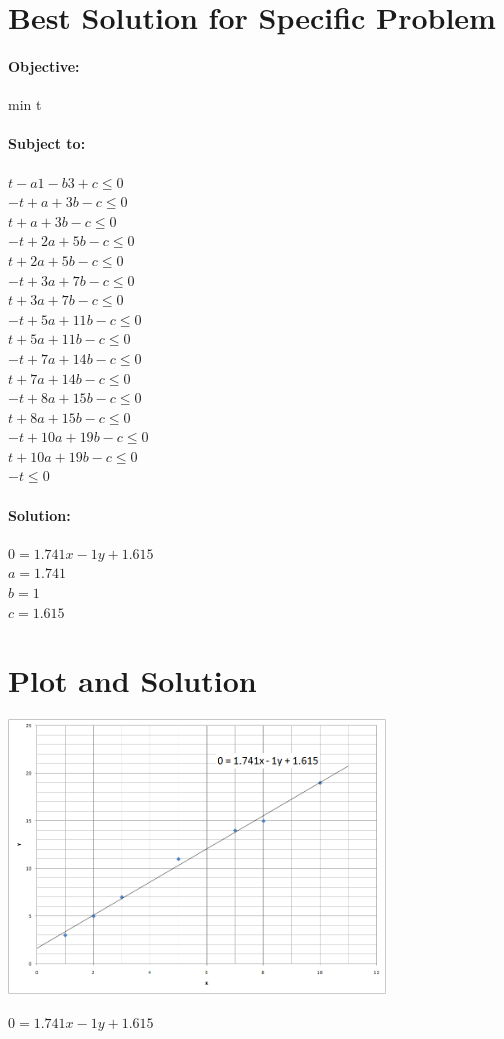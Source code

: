 \documentclass{article}
\begin{document}
\section*{Best Solution for Specific Problem}
\paragraph*{Objective:}
min t

\paragraph*{Subject to:\\}
$t - a1 - b3 + c \leq 0$\\
$-t + a + 3b - c \leq 0$\\
$t + a + 3b - c \leq 0$\\
$-t + 2a + 5b - c \leq 0$\\
$t + 2a + 5b - c \leq 0$\\
$-t + 3a + 7b - c \leq 0$\\
$t + 3a + 7b - c \leq 0$\\
$-t + 5a + 11b - c \leq 0$\\
$t + 5a + 11b - c \leq 0$\\
$-t + 7a + 14b - c \leq 0$\\
$t + 7a + 14b - c \leq 0$\\
$-t + 8a + 15b - c \leq 0$\\
$t + 8a + 15b - c \leq 0$\\
$-t + 10a + 19b - c \leq 0$\\
$t + 10a + 19b - c \leq 0$\\
$-t \leq 0$\\

\paragraph*{Solution:\\}
$0 = 1.741x - 1y + 1.615$\\
$a = 1.741$\\
$b = 1$\\
$c = 1.615$\\

\section*{Plot and Solution}
\centerline{\includegraphics[width=0.75\textwidth]{plot.png}}
$0 = 1.741x - 1y + 1.615$
\end{document}
